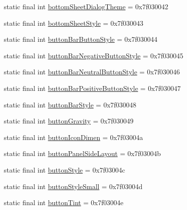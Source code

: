 \begin{DoxyCompactItemize}
\item 
static final int \mbox{\hyperlink{classandroid_1_1support_1_1design_1_1_r_1_1attr_ace2cb111acbe24b3c9641a3fd77ef369}{bottom\+Sheet\+Dialog\+Theme}} = 0x7f030042
\item 
static final int \mbox{\hyperlink{classandroid_1_1support_1_1design_1_1_r_1_1attr_adcad9a53f8c39a262eff4fa7e1f02604}{bottom\+Sheet\+Style}} = 0x7f030043
\item 
static final int \mbox{\hyperlink{classandroid_1_1support_1_1design_1_1_r_1_1attr_a3a9d5900929a564d36943910be6f5f8e}{button\+Bar\+Button\+Style}} = 0x7f030044
\item 
static final int \mbox{\hyperlink{classandroid_1_1support_1_1design_1_1_r_1_1attr_ad684421bc3fb71c6503b0b9a0ba2474b}{button\+Bar\+Negative\+Button\+Style}} = 0x7f030045
\item 
static final int \mbox{\hyperlink{classandroid_1_1support_1_1design_1_1_r_1_1attr_af941874bd15ba48802fe339d3aed2e67}{button\+Bar\+Neutral\+Button\+Style}} = 0x7f030046
\item 
static final int \mbox{\hyperlink{classandroid_1_1support_1_1design_1_1_r_1_1attr_adfdaff8d5b88aedcb767a3d361b26536}{button\+Bar\+Positive\+Button\+Style}} = 0x7f030047
\item 
static final int \mbox{\hyperlink{classandroid_1_1support_1_1design_1_1_r_1_1attr_aa0cd4b2b184796faaa8598d7d55a1980}{button\+Bar\+Style}} = 0x7f030048
\item 
static final int \mbox{\hyperlink{classandroid_1_1support_1_1design_1_1_r_1_1attr_a75311b0c5dc69c448a21375dea186e57}{button\+Gravity}} = 0x7f030049
\item 
static final int \mbox{\hyperlink{classandroid_1_1support_1_1design_1_1_r_1_1attr_adc31bdca5022773d002dc4959984448e}{button\+Icon\+Dimen}} = 0x7f03004a
\item 
static final int \mbox{\hyperlink{classandroid_1_1support_1_1design_1_1_r_1_1attr_af8a569d126f3f38713edd8c55471112d}{button\+Panel\+Side\+Layout}} = 0x7f03004b
\item 
static final int \mbox{\hyperlink{classandroid_1_1support_1_1design_1_1_r_1_1attr_af811016b90d459ec8303bdee577b3bbe}{button\+Style}} = 0x7f03004c
\item 
static final int \mbox{\hyperlink{classandroid_1_1support_1_1design_1_1_r_1_1attr_a6229dc8c52c9cb2bb1b60ae629a23df8}{button\+Style\+Small}} = 0x7f03004d
\item 
static final int \mbox{\hyperlink{classandroid_1_1support_1_1design_1_1_r_1_1attr_a481984709e9647ce5d7948243edfe917}{button\+Tint}} = 0x7f03004e

\end{DoxyCompactItemize}
